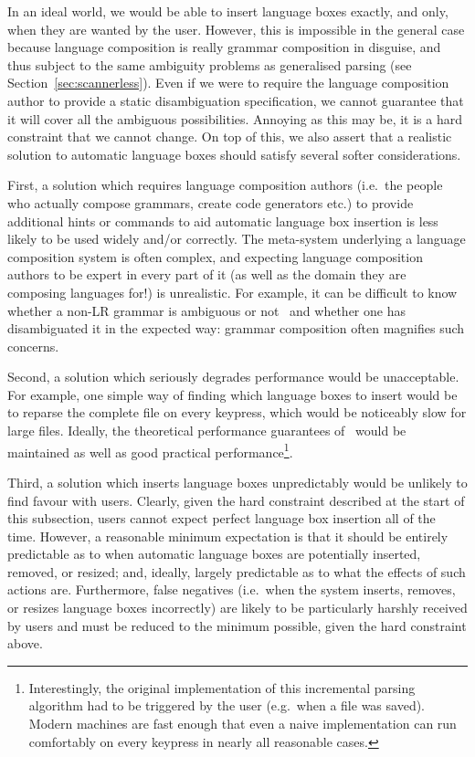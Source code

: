 \documentclass[sigplan,screen]{acmart}\settopmatter{printfolios=true,printccs=false,printacmref=false}
\begin{document}
In an ideal world, we would be able to insert language boxes exactly, and only,
when they are wanted by the user. However, this is impossible in the
general case because language composition is really grammar composition
in disguise, and thus subject to the same ambiguity problems as generalised
parsing (see Section~\ref{sec:scannerless}). Even if we were to require the
language composition author to provide a static disambiguation specification,
we cannot guarantee that it will cover all the ambiguous
possibilities. Annoying as this may be, it is a hard constraint that we cannot
change. On top of this, we also assert that a realistic solution to automatic
language boxes should satisfy several softer considerations.

First, a solution which requires language composition authors (i.e.~the people
who actually compose grammars, create code generators etc.) to provide additional
hints or commands to aid automatic language box insertion is less likely
to be used widely and/or correctly. The meta-system underlying a language
composition system is often complex, and expecting language composition authors
to be expert in every part of it (as well as the domain they are composing
languages for!) is unrealistic. For example, it can be difficult to know whether
a non-LR grammar is ambiguous or not~\cite{vasudevan13detecting} and whether
one has disambiguated it in the expected way: grammar
composition often magnifies such concerns.

Second, a solution which seriously degrades performance would be unacceptable.
For example, one simple way of finding which language boxes to insert would
be to reparse the complete file on every keypress, which would be noticeably slow for large
files. Ideally, the theoretical performance guarantees
of~\citet{wagner98practicalalgorithms} would be maintained as well as good
practical performance\footnote{Interestingly, the original implementation of
this incremental parsing algorithm had to be triggered by the user (e.g.~when
a file was saved). Modern machines are fast enough that even a naive
implementation can run comfortably on every keypress in nearly all reasonable
cases.}.

Third, a solution which inserts language boxes unpredictably would be unlikely
to find favour with users. Clearly, given the hard constraint described at the
start of this subsection, users cannot expect perfect language box insertion
all of the time. However, a reasonable minimum expectation is that it should be
entirely predictable as to when automatic language boxes are potentially
inserted, removed, or
resized; and, ideally, largely predictable as to what the effects of such
actions are. Furthermore, false negatives (i.e.~when the system inserts, removes,
or resizes language boxes incorrectly) are likely to be particularly harshly
received by users and must be reduced to the minimum possible, given the hard
constraint above.
\end{document}
